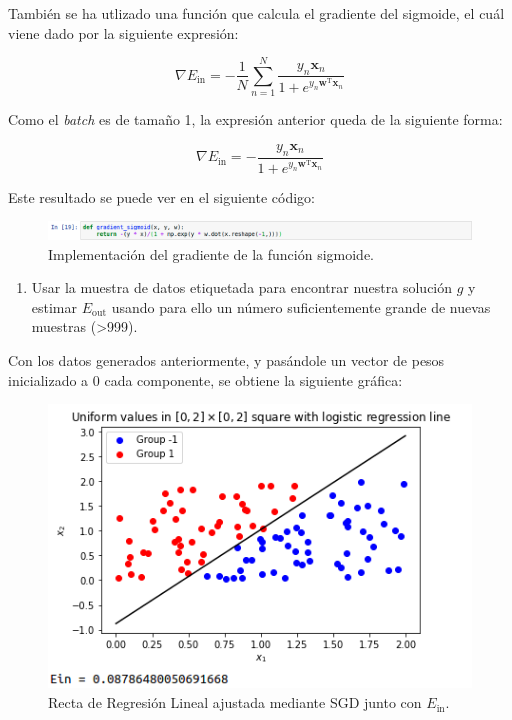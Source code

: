 \documentclass[11pt,a4paper]{article}
\newcommand{\eout}{$E_{\text{out}}$}
\newcommand{\ein}{$E_{\text{in}}$}
\begin{document}
También se ha utlizado una función que calcula el gradiente del sigmoide, el cuál viene dado por la
siguiente expresión:

\begin{equation}
	\nabla E_{\text{in}} = - \frac{1}{N}
	\sum_{n = 1}^N \frac{y_n\mathbf{x}_n}{1 + e^{y_n\mathbf{w}^{\text{T}}\mathbf{x}_n}}
\end{equation}

Como el \textit{batch} es de tamaño 1, la expresión anterior queda de la siguiente forma:

\begin{equation}
	\nabla E_{\text{in}} = - \frac{y_n\mathbf{x}_n}{1 + e^{y_n\mathbf{w}^{\text{T}}\mathbf{x}_n}}
\end{equation}

Este resultado se puede ver en el siguiente código:

\begin{figure}[H]
\centering
\includegraphics[scale=0.4]{img/gradient_sigmoid.png}
\caption{Implementación del gradiente de la función sigmoide.}
\end{figure}

\begin{enumerate}[resume,label=\textit{\alph*})]
	\item Usar la muestra de datos etiquetada para encontrar nuestra solución $g$ y estimar 
	\eout{} usando para ello un número suficientemente grande de nuevas muestras (>999).
\end{enumerate}

Con los datos generados anteriormente, y pasándole un vector de pesos inicializado a 0 cada
componente, se obtiene la siguiente gráfica:

\begin{figure}[H]
\centering
\includegraphics[scale=0.6]{img/regression_2.png}
\caption{Recta de Regresión Lineal ajustada mediante SGD junto con \ein.}
\end{figure}
\end{document}
